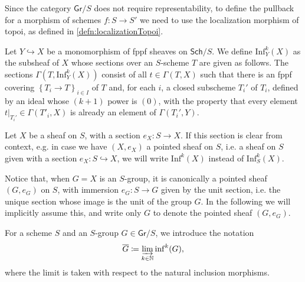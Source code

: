 \begin{rem}[]
	Since the category $\mathsf{Gr}/S$ does not require representability,
	to define the pullback for a morphism of schemes $f\colon S \to S'$
	we need to use the localization morphism of topoi, as defined in
	\cref{defn:localizationTopoi}.
\end{rem}


\begin{defn}\label{defn:kInfNeighbourhood}
	Let $Y \hookrightarrow X$ be a monomorphism of fppf sheaves on \(\mathsf{Sch}/S\).
	We define $\mathrm{Inf}_Y^k(X)$ as the subsheaf of $X$
	whose sections over an $S$-scheme $T$
	are given as follows.
	The sections $\Gamma ( T , \mathrm{Inf}_Y^k(X) )$ consist of all
	$t \in \Gamma \left( T, X \right)$ such that
	there is an fppf covering $\left\{ T_{ i } \to T \right\}_{ i \in I }$
	of $T$ and, for each $i$, a closed subscheme $T_i'$ of $T_i$,
	defined by an ideal whose $(k+1)$ power is $(0)$,
	with the property that every element $\left.t\right|_{T_i'} \in \Gamma(T'_i, X)$
	is already an element of $\Gamma(T_i', Y)$.
\end{defn}


\begin{ntt}[]
	Let $X$ be a sheaf on $S$, with a section $e_X\colon S \to X$.
	If this section is clear from context, e.g. in case we have
	$(X, e_X)$ a pointed sheaf on $S$, i.e. a sheaf on $S$
	given with a section $e_X\colon S \hookrightarrow X$,
	we will write $\mathrm{Inf}^k(X)$
	instead of $\mathrm{Inf}_S^k(X)$.
\end{ntt}


\begin{rem}[]
	Notice that, when $G = X$ is an $S$-group, it is canonically a
	pointed sheaf $\left(G, e_G\right)$ on $S$, with immersion $e_G\colon S \to G$
	given by the unit section, i.e. the unique section whose image
	is the unit of the group $G$.
	In the following we will implicitly assume this, and write only
	$G$ to denote the pointed sheaf $(G, e_G)$.
\end{rem}


\begin{ntt}\label{not:GBar}
	For a scheme $S$ and an $S$-group $G \in \mathsf{Gr}/S$, we introduce
	the notation 
	\begin{equation*}
	\overline{G} \coloneqq \varinjlim_{k \in \mathbb{N}} \mathrm{inf}^k(G)
	,\end{equation*}
	where the limit is taken with respect to the natural inclusion morphisms.
\end{ntt} 


